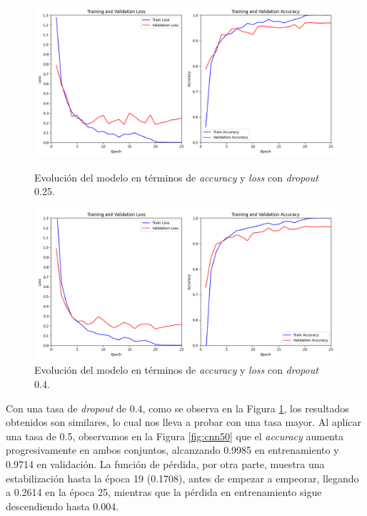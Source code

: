 \begin{figure}[h]
    \centering
    \begin{minipage}{0.45\textwidth}
        \centering
        \includegraphics[width=\textwidth]{img/malware_classifier_dropout25.png} %
        \caption{Evolución del modelo en términos de \textit{accuracy} y \textit{loss} con \textit{dropout} 0.25.}
        \label{fig:cnn25}
    \end{minipage}\hfill
    \begin{minipage}{0.45\textwidth}
        \centering
        \includegraphics[width=\textwidth]{img/malware_classifier_dropout40.png} 
        \caption{Evolución del modelo en términos de \textit{accuracy} y \textit{loss} con \textit{dropout} 0.4.}
        \label{fig:cnn40}
    \end{minipage}
\end{figure}

Con una tasa de \textit{dropout} de 0.4, como se observa en la Figura \ref{fig:cnn40}, los resultados obtenidos son similares, lo cual nos lleva a probar con una tasa mayor. Al aplicar una tasa de 0.5, observamos en la Figura \ref{fig:cnn50} que el \textit{accuracy} aumenta progresivamente en ambos conjuntos, alcanzando 0.9985 en entrenamiento y 0.9714 en validación. La función de pérdida, por otra parte, muestra una estabilización hasta la época 19 (0.1708), antes de empezar a empeorar, llegando a 0.2614 en la época 25, mientras que la pérdida en entrenamiento sigue descendiendo hasta 0.004.

